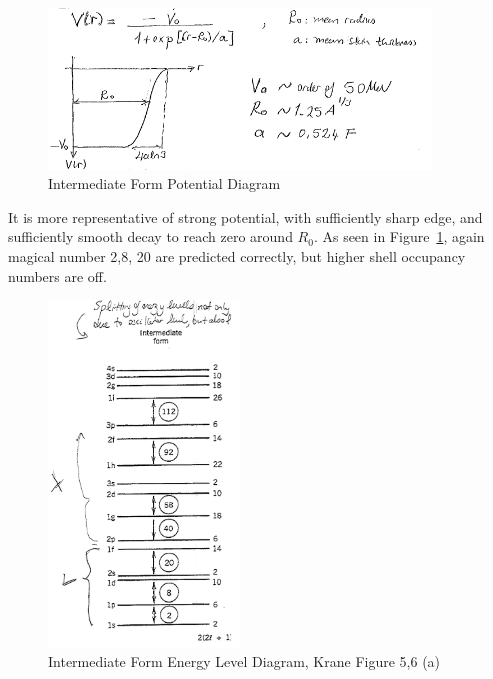 \documentclass{school-22.101-notes}
\begin{document}
\begin{figure}[h!]
    \centering
    \includegraphics[width=4in]{images/shell/intermediate-form-potential.png}
    \caption{Intermediate Form Potential Diagram}
\end{figure}

It is more representative of strong potential, with sufficiently sharp edge, and sufficiently smooth decay to reach zero around $R_0$. As seen in Figure~\ref{intermediate-energy}, again magical number 2,8, 20 are predicted correctly, but higher shell occupancy numbers are off. 

\begin{figure}[h!]
    \centering
    \includegraphics[width=2in]{images/shell/intermediate-potential-energy.png}
    \caption{Intermediate Form Energy Level Diagram, Krane Figure 5,6 (a)}
    \label{intermediate-energy}
\end{figure}
\end{document}
